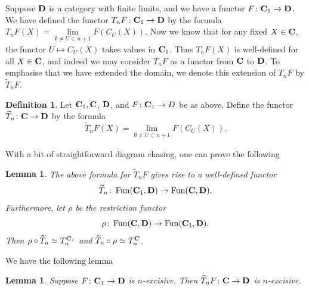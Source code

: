 \documentclass[psamsfonts]{amsart}
\theoremstyle{plain}
\newtheorem{lem}[thm]{Lemma}
\theoremstyle{definition}
\newtheorem{defn}[thm]{Definition}
\theoremstyle{remark}
\newcommand{\catname}[1]{{\normalfont\textbf{#1}}}
\DeclareMathOperator{\fun}{Fun}
\begin{document}
Suppose $\catname{D}$ is a category with finite limits, and we have a functor $F\colon \catname{C}_1\to \catname{D}$. We have defined the functor $T_nF\colon \catname{C}_1\to \catname{D}$ by the formula $T_nF(X)=\underset{\emptyset\ne U\subset \underline{n+1}}{\lim}F(C_U(X))$. Now we know that for any fixed $X\in \catname{C}$, the functor $U\mapsto C_U(X)$ takes values in $\catname{C}_1$. Thus $T_nF(X)$ is well-defined for all $X\in \catname{C}$, and indeed we may consider $T_nF$ as a functor from $\catname{C}$ to $\catname{D}$. To emphasise that we have extended the domain, we denote this extension of $T_nF$ by $\widetilde T_nF$.
\begin{defn}
Let $\catname{C}_1, \catname{C}$, $\catname{D}$, and $F\colon\catname{C}_1\to D$ be as above. Define the functor $\widetilde T_n\colon \catname{C}\to \catname{D}$ by the formula
\[
\widetilde T_n F(X)= \underset{\emptyset\ne U\subset \underline{n+1}}{\lim}F(C_U(X)).
\]
\end{defn}
With a bit of straightforward diagram chasing, one can prove the following
\begin{lem}\label{lemma:inverse}
The above formula for $\widetilde T_nF$ gives rise to a well-defined functor
\[
\widetilde T_n\colon \fun(\catname{C}_1, \catname{D})\to \fun(\catname{C}, \catname{D}).
\]
Furthermore, let $\rho$ be the restriction functor
\[
\rho\colon \fun(\catname{C}, \catname{D})\to \fun(\catname{C}_1, \catname{D}).
\]
Then $\rho\circ \widetilde T_n\simeq T_n^{\catname{C}_1}$ and $\widetilde T_n\circ \rho\simeq T_n^{\catname{C}}$.
\end{lem}
We have the following lemma
\begin{lem}\label{lemma:excisive}
Suppose $F\colon \catname{C}_1\to\catname{D}$ is $n$-excisive. Then $\widetilde T_n F\colon \catname{C}\to \catname{D}$ is $n$-excisive.
\end{lem}
\end{document}
